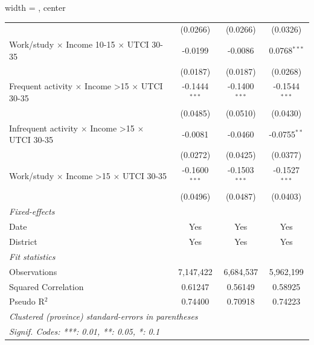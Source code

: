 \begin{table}[htbp]
\begin{adjustbox}{width = \textwidth, center}
\begin{tabular}{lccc}
                                                                         & (0.0266)                  & (0.0266)                & (0.0326)\\   
         Work/study $\times$ Income 10-15 $\times$ UTCI 30-35            & -0.0199                   & -0.0086                 & 0.0768$^{***}$\\   
                                                                         & (0.0187)                  & (0.0187)                & (0.0268)\\   
         Frequent activity $\times$ Income >15 $\times$ UTCI 30-35       & -0.1444$^{***}$           & -0.1400$^{***}$         & -0.1544$^{***}$\\   
                                                                         & (0.0485)                  & (0.0510)                & (0.0430)\\   
         Infrequent activity $\times$ Income >15 $\times$ UTCI 30-35     & -0.0081                   & -0.0460                 & -0.0755$^{**}$\\   
                                                                         & (0.0272)                  & (0.0425)                & (0.0377)\\   
         Work/study $\times$ Income >15 $\times$ UTCI 30-35              & -0.1600$^{***}$           & -0.1503$^{***}$         & -0.1527$^{***}$\\   
                                                                         & (0.0496)                  & (0.0487)                & (0.0403)\\   
         \midrule
         \emph{Fixed-effects}\\
         Date                                                            & Yes                       & Yes                     & Yes\\  
         District                                                        & Yes                       & Yes                     & Yes\\  
         \midrule
         \emph{Fit statistics}\\
         Observations                                                    & 7,147,422                 & 6,684,537               & 5,962,199\\  
         Squared Correlation                                             & 0.61247                   & 0.56149                 & 0.58925\\  
         Pseudo R$^2$                                                    & 0.74400                   & 0.70918                 & 0.74223\\  
         \midrule \midrule
         \multicolumn{4}{l}{\emph{Clustered (province) standard-errors in parentheses}}\\
         \multicolumn{4}{l}{\emph{Signif. Codes: ***: 0.01, **: 0.05, *: 0.1}}\\
      \end{tabular}
   \end{adjustbox}
\end{table}


